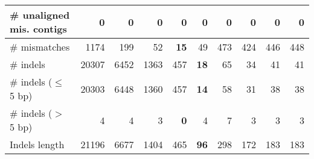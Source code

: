 \documentclass[12pt,a4paper]{article}
\begin{document}
\begin{table}[ht]
\begin{center}
\begin{tabular}{|l*{9}{|r}|}
\# unaligned mis. contigs & 0 & 0 & 0 & 0 & 0 & 0 & 0 & 0 & 0 \\ \hline
\# mismatches & 1174 & 199 & 52 & {\bf 15} & 49 & 473 & 424 & 446 & 448 \\ \hline
\# indels & 20307 & 6452 & 1363 & 457 & {\bf 18} & 65 & 34 & 41 & 41 \\ \hline
\hspace{5mm}\# indels ($\leq$ 5 bp) & 20303 & 6448 & 1360 & 457 & {\bf 14} & 58 & 31 & 38 & 38 \\ \hline
\hspace{5mm}\# indels ($>$ 5 bp) & 4 & 4 & 3 & {\bf 0} & 4 & 7 & 3 & 3 & 3 \\ \hline
Indels length & 21196 & 6677 & 1404 & 465 & {\bf 96} & 298 & 172 & 183 & 183 \\ \hline
\end{tabular}
\end{center}
\end{table}
\end{document}
